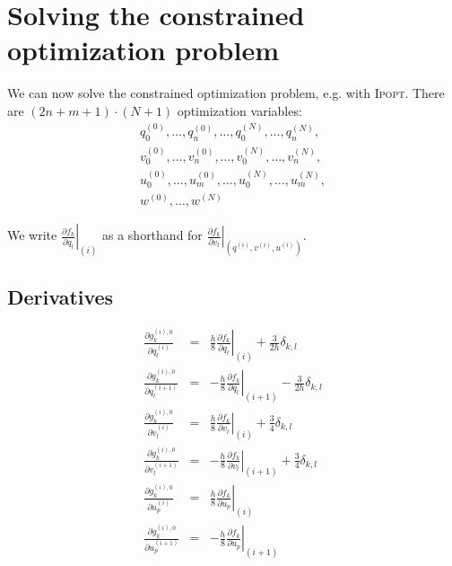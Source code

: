 \documentclass[a4paper]{article}
\begin{document}
\section{Solving the constrained optimization problem}
We can now solve the constrained optimization problem, e.g. with \textsc{Ipopt}. There are $(2n + m + 1)\cdot (N+1)$ optimization variables:
\begin{eqnarray*}
q_0^{(0)}, \ldots, q_n^{(0)}, \ldots, q_0^{(N)}, \ldots, q_n^{(N)},\\
v_0^{(0)}, \ldots, v_n^{(0)}, \ldots, v_0^{(N)}, \ldots, v_n^{(N)},\\
u_0^{(0)}, \ldots, u_m^{(0)}, \ldots, u_0^{(N)}, \ldots, u_m^{(N)},\\
w^{(0)}, \ldots, w^{(N)}
\end{eqnarray*}

We write $\left. \frac{\partial f_k}{\partial q_l} \right|_{(i)}$ as a shorthand for $\left. \frac{\partial f_k}{\partial v_l} \right|_{(q^{(i)}, v^{(i)}, u^{(i)})}$.

\subsection{Derivatives}
\begin{eqnarray}
\frac{\partial g_k^{(i),0}}{\partial q_l^{(i)}} 
&=& \left. \frac{h}{8} \frac{\partial f_k}{\partial q_l} \right|_{(i)}
 + \frac{3}{2h} \delta_{k,l}\\
\frac{\partial g_k^{(i),0}}{\partial q_l^{(i+1)}} 
&=& -\left. \frac{h}{8} \frac{\partial f_k}{\partial q_l} \right|_{(i+1)}
 - \frac{3}{2h} \delta_{k,l}\\
\frac{\partial g_k^{(i),0}}{\partial v_l^{(i)}} 
&=& \left. \frac{h}{8} \frac{\partial f_k}{\partial v_l} \right|_{(i)}
 + \frac{3}{4} \delta_{k,l}\\
\frac{\partial g_k^{(i),0}}{\partial v_l^{(i+1)}} 
&=& -\left. \frac{h}{8} \frac{\partial f_k}{\partial v_l} \right|_{(i+1)}
 + \frac{3}{4} \delta_{k,l}\\
 \frac{\partial g_k^{(i),0}}{\partial u_p^{(i)}} 
&=& \left. \frac{h}{8} \frac{\partial f_k}{\partial u_p} \right|_{(i)}\\
 \frac{\partial g_k^{(i),0}}{\partial u_p^{(i+1)}} 
&=& -\left. \frac{h}{8} \frac{\partial f_k}{\partial u_p} \right|_{(i+1)}
\end{eqnarray}
\end{document}
